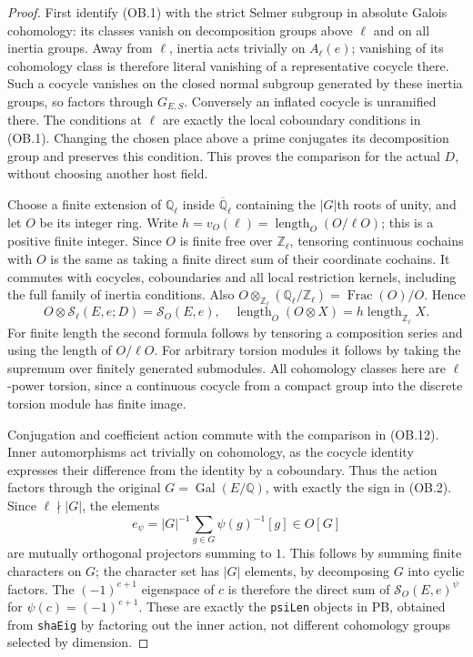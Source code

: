 \begin{proof}
First identify (OB.1) with the strict Selmer subgroup in absolute
Galois cohomology: its classes vanish on decomposition groups above
$\ell$ and on all inertia groups.  Away from $\ell$, inertia acts
trivially on $A_\ell(e)$; vanishing of its cohomology class is
therefore literal vanishing of a representative cocycle there.
Such a cocycle vanishes on the closed normal subgroup generated
by these inertia groups, so factors through $G_{E,S}$.
Conversely an inflated cocycle is unramified there.  The conditions
at $\ell$ are exactly the local coboundary conditions in (OB.1).
Changing the chosen place above a prime conjugates its decomposition
group and preserves this condition.  This proves the comparison
for the actual $D$, without choosing another host field.

Choose a finite extension of $\mathbb Q_\ell$ inside
$\overline{\mathbb Q}_\ell$ containing the $|G|$th roots of unity,
and let $O$ be its integer ring.  Write
$h=v_O(\ell)=\operatorname{length}_O(O/\ell O)$; this is a positive
finite integer.  Since $O$ is finite free over $\mathbb Z_\ell$,
tensoring continuous cochains with $O$ is the same as taking a
finite direct sum of their coordinate cochains.  It commutes with
cocycles, coboundaries and all local restriction kernels, including
the full family of inertia conditions.  Also
$O\otimes_{\mathbb Z_\ell}(\mathbb Q_\ell/\mathbb Z_\ell)
=\operatorname{Frac}(O)/O$.  Hence
\[
 O\otimes\mathcal S_\ell(E,e;D)=\mathcal S_O(E,e),
 \quad
 \operatorname{length}_O(O\otimes X)
             =h\operatorname{length}_{\mathbb Z_\ell}X.
 \tag{OB.12}
\]
For finite length the second formula follows by tensoring a
composition series and using the length of $O/\ell O$.
For arbitrary torsion modules it follows by taking the supremum
over finitely generated submodules.  All cohomology classes here
are $\ell$-power torsion, since a continuous cocycle from a compact
group into the discrete torsion module has finite image.

Conjugation and coefficient action commute with the comparison in
(OB.12).  Inner automorphisms act trivially on cohomology, as the
cocycle identity expresses their difference from the identity by
a coboundary.  Thus the action factors through the original
$G=\operatorname{Gal}(E/\mathbb Q)$, with exactly the sign in (OB.2).
Since $\ell\nmid |G|$, the elements
\[
 e_\psi=|G|^{-1}\sum_{g\in G}\psi(g)^{-1}[g]\in O[G]
\]
are mutually orthogonal projectors summing to $1$.
This follows by summing finite characters on $G$; the character
set has $|G|$ elements, by decomposing $G$ into cyclic factors.
The $(-1)^{e+1}$ eigenspace of $c$ is therefore the direct sum of
$\mathcal S_O(E,e)^\psi$ for
$\psi(c)=(-1)^{e+1}$.  These are exactly the \texttt{psiLen}
objects in PB, obtained from \texttt{shaEig} by factoring out the
inner action, not different cohomology groups selected by dimension.


\end{proof}
